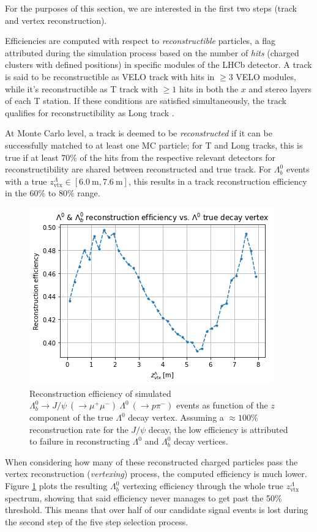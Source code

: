 For the purposes of this section, we are interested in the first two steps (track and vertex reconstruction).

Efficiencies are computed with respect to \textit{reconstructible} particles, a flag attributed during the simulation process based on the number of \textit{hits} (charged clusters with defined positions) in specific modules of the LHCb detector.
A track is said to be reconstructible as VELO track with hits in $\geq 3$ VELO modules, while it's reconstructible as T track with $\geq 1$ hits in both the $x$ and stereo layers of each T station.
If these conditions are satisfied simultaneously, the track qualifies for reconstructibility as Long track \cite{Li:2752971}.

At Monte Carlo level, a track is deemed to be \textit{reconstructed} if it can be successfully matched to at least one MC particle;
for T and Long tracks, this is true if at least $70\%$ of the hits from the respective relevant detectors for reconstructibility are shared between reconstructed and true track. For $\Lambda^0_b$ events with a true $z_\text{vtx}^\Lambda \in [\SI{6.0}{\meter}, \SI{7.6}{\meter}]$, this results in a track reconstruction efficiency in the 60\% to 80\% range.

\begin{figure}[t!]
	\centering
	\includegraphics[width=.6\textwidth]{graphics/03-vertex_reconstruction/lambda_lambdab_reco_efficiency.png}
	\caption[A]{Reconstruction efficiency of simulated $\Lambda^0_b \rightarrow J/\psi~(\rightarrow \mu^+\mu^-)~\Lambda^0~(\rightarrow p\pi^-)$ events as function of the $z$ component of the true $\Lambda^0$ decay vertex. Assuming a $\approx 100\%$ reconstruction rate for the $J/\psi$ decay, the low efficiency is attributed to failure in reconstructing $\Lambda^0$ and $\Lambda^0_b$ decay vertices.}
	\label{fig:lambda_lambdab_reco_efficiency}
\end{figure}

When considering how many of these reconstructed charged particles pass the vertex reconstruction (\textit{vertexing}) process, the computed efficiency is much lower.
Figure \ref{fig:lambda_lambdab_reco_efficiency} plots the resulting $\Lambda_b^0$ vertexing efficiency through the whole true $z_\text{vtx}^\Lambda$ spectrum, showing that said efficiency never manages to get past the 50\% threshold.
This means that over half of our candidate signal events is lost during the second step of the five step selection process.

